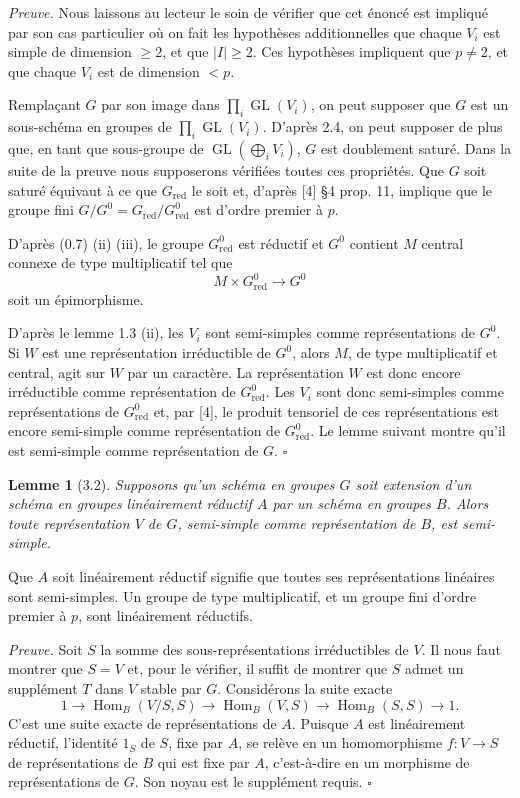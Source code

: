 \documentclass[10pt]{article}
\newcommand{\GL}{\operatorname{GL}}
\newcommand{\red}{\mathrm{red}}
\newcommand{\Hom}{\operatorname{Hom}}
\theoremstyle{deligne}
\newtheorem*{lemma*}{Lemme}
\newenvironment{proofdel}{\textit{Preuve.}}{\hfill$\square$}
\begin{document}
\begin{proofdel}
Nous laissons au lecteur le soin de vérifier que cet énoncé est impliqué par son cas particulier où on fait les hypothèses additionnelles que chaque \(V_i\) est simple de dimension \(\ge2\), et que \(|I|\ge2\). Ces hypothèses impliquent que \(p\ne2\), et que chaque \(V_i\) est de dimension \(<p\).

Remplaçant \(G\) par son image dans \(\prod_i\GL(V_i)\), on peut supposer que \(G\) est un sous-schéma en groupes de \(\prod_i\GL(V_i)\). D'après 2.4, on peut supposer de plus que, en tant que sous-groupe de \(\GL(\bigoplus_i V_i)\), \(G\) est doublement saturé. Dans la suite de la preuve nous supposerons vérifiées toutes ces propriétés. Que \(G\) soit saturé équivaut à ce que \(G_{\red}\) le soit et, d'après [4] \S4 prop. 11, implique que le groupe fini \(G/G^0=G_{\red}/G^0_{\red}\) est d'ordre premier à \(p\).

D'après (0.7) (ii) (iii), le groupe \(G^0_{\red}\) est réductif et \(G^0\) contient \(M\) central connexe de type multiplicatif tel que
\[
M\times G^0_{\red}\longrightarrow G^0
\]
soit un épimorphisme.

D'après le lemme 1.3 (ii), les \(V_i\) sont semi-simples comme représentations de \(G^0\). Si \(W\) est une représentation irréductible de \(G^0\), alors \(M\), de type multiplicatif et central, agit sur \(W\) par un caractère. La représentation \(W\) est donc encore irréductible comme représentation de \(G^0_{\red}\). Les \(V_i\) sont donc semi-simples comme représentations de \(G^0_{\red}\) et, par [4], le produit tensoriel de ces représentations est encore semi-simple comme représentation de \(G^0_{\red}\). Le lemme suivant montre qu'il est semi-simple comme représentation de \(G\).
\end{proofdel}

\begin{lemma*}[3.2]
Supposons qu'un schéma en groupes \(G\) soit extension d'un schéma en groupes linéairement réductif \(A\) par un schéma en groupes \(B\). Alors toute représentation \(V\) de \(G\), semi-simple comme représentation de \(B\), est semi-simple.
\end{lemma*}

Que \(A\) soit linéairement réductif signifie que toutes ses représentations linéaires sont semi-simples. Un groupe de type multiplicatif, et un groupe fini d'ordre premier à \(p\), sont linéairement réductifs.

\begin{proofdel}
Soit \(S\) la somme des sous-représentations irréductibles de \(V\). Il nous faut montrer que \(S=V\) et, pour le vérifier, il suffit de montrer que \(S\) admet un supplément \(T\) dans \(V\) stable par \(G\). Considérons la suite exacte
\[
1\longrightarrow \Hom_B(V/S,S)\longrightarrow \Hom_B(V,S)\longrightarrow \Hom_B(S,S)\longrightarrow 1.
\]
C'est une suite exacte de représentations de \(A\). Puisque \(A\) est linéairement réductif, l'identité \(1_S\) de \(S\), fixe par \(A\), se relève en un homomorphisme \(f:V\to S\) de représentations de \(B\) qui est fixe par \(A\), c'est-à-dire en un morphisme de représentations de \(G\). Son noyau est le supplément requis.
\end{proofdel}
\end{document}

